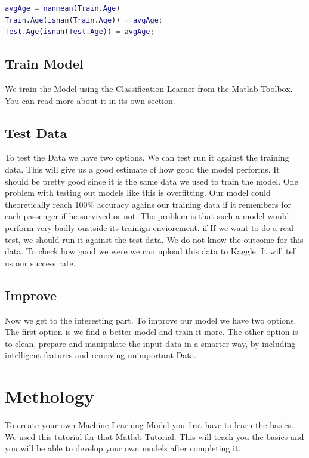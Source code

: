 \documentclass[
   10.5pt,
   invert-title=true,
   titlepage=false,
   titleimage-ratio=13,
   class=article
]{bfhpub}				%
\begin{document}
\begin{lstlisting}[language=Matlab]
avgAge = nanmean(Train.Age)          
Train.Age(isnan(Train.Age)) = avgAge;  
Test.Age(isnan(Test.Age)) = avgAge;    
\end{lstlisting}

\subsection*{Train Model}
We train the Model using the Classification Learner from the Matlab Toolbox. You can read more about it in its own section. 
 
\subsection*{Test Data}
To test the Data we have two options. We can test run it against the training data. This will give us a good estimate of how good the model performs. It should be pretty good since it is the same data we used to train the model. One problem with testing out models like this is overfitting. Our model could theoretically reach 100\% accuracy agains our training data if it remembers for each passenger if he survived or not. The problem is that such a model would perform very badly oustside its trainign enviorement. if If we want to do a real test, we should run it against the test data. We do not know the outcome for this data. To check how good we were we can upload this data to Kaggle. It will tell us our success rate. 

\subsection*{Improve}
Now we get to the interesting part. To improve our model we have two options. The first option is we find a better model and train it more. The other option is to clean, prepare and manipulate the input data in a smarter way, by including intelligent features and removing unimportant Data.


\section*{Methology}
To create your own Machine Learning Model you first have to learn the basics. We used this tutorial for that \href{https://blogs.mathworks.com/loren/2015/06/18/getting-started-with-kaggle-data-science-competitions/}{Matlab-Tutorial}.
This will teach you the basics and you will be able to develop your own models after completing it.
\end{document}
